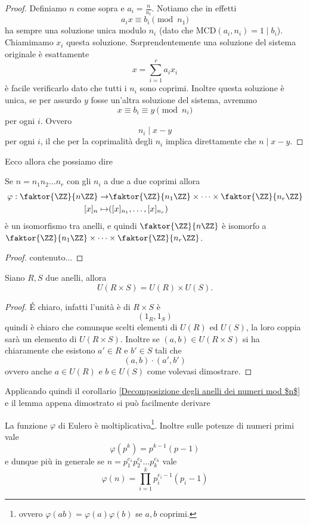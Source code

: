 \documentclass[11pt]{scrartcl}
\newcommand{\MCD}{\text{MCD}}
\begin{document}
	\begin{proof}
		Definiamo $n$ come sopra e $a_i=\frac{n}{n_i}$. Notiamo che in effetti 
		$$a_ix\equiv b_i\pmod{n_1}$$
		ha sempre una soluzione unica modulo $n_i$ (dato che $\MCD(a_i,n_i)=1\mid b_i$). Chiamimamo $x_i$ questa soluzione. Sorprendentemente una soluzione del sistema originale è esattamente
		$$x=\sum_{i=1}^r a_ix_i $$
		è facile verificarlo dato che tutti i $n_i$ sono coprimi. Inoltre questa soluzione è unica, se per assurdo $y$ fosse un'altra soluzione del sistema, avremmo
		$$x\equiv b_i \equiv y \pmod{n_i}$$
		per ogni $i$. Ovvero
		$$n_i\mid x-y$$
		per ogni $i$, il che per la coprimalità degli $n_i$ implica direttamente che $n\mid x-y$.
	\end{proof}
	Ecco allora che possiamo dire
	\begin{corollary}\label{Decomposizione degli anelli dei numeri mod $n$}
		Se $n=n_1n_2\dots n_r$ con gli $n_i$ a due a due coprimi allora 
		\begin{align*}
			\varphi:\faktor{\ZZ}{n\ZZ}\to &\faktor{\ZZ}{n_1\ZZ}\times\dots\times \faktor{\ZZ}{n_r\ZZ}\\
			[x]_n\mapsto & ([x]_{n_1},\dots,[x]_{n_r})
		\end{align*}
		è un isomorfismo tra anelli, e quindi $\faktor{\ZZ}{n\ZZ}$ è isomorfo a $\faktor{\ZZ}{n_1\ZZ}\times\dots\times \faktor{\ZZ}{n_r\ZZ}$.
	\end{corollary}
	\begin{proof}
		contenuto...
	\end{proof}
	\begin{lemma}
		Siano $R,S$ due anelli, allora
		$$U(R\times S)=U(R)\times U(S).$$
	\end{lemma}
	\begin{proof}
		\'E chiaro, infatti l'unità è di $R\times S$ è 
		$$(1_R,1_S)$$
		quindi è chiaro che comunque scelti elementi di $U(R)$ ed $U(S)$, la loro coppia sarà un elemento di $U(R\times S)$. Inoltre se $(a,b)\in U(R\times S)$ si ha chiaramente che esistono $a'\in R$ e $b'\in S$ tali che
		$$(a,b)\cdot(a',b')$$
		ovvero anche $a\in U(R)$ e $b\in U(S)$ come volevasi dimostrare.
	\end{proof}
	Applicando quindi il corollario \ref{Decomposizione degli anelli dei numeri mod $n$} e il lemma appena dimostrato si può facilmente derivare
	\begin{corollary}
		La funzione $\varphi$ di Eulero è moltiplicativa\footnote{ovvero $\varphi(ab)=\varphi(a)\varphi(b)$ se $a,b$ coprimi.}. Inoltre sulle potenze di numeri primi vale
		$$\varphi(p^k)=p^{k-1}(p-1)$$
		e dunque più in generale se $n=p_1^{e_1}p_2^{e_2}\dots p_k^{e_k}$ vale
		$$\varphi(n)=\prod_{i=1}^k p_i^{e_i-1}(p_i-1)$$
	\end{corollary}
	
\end{document}

